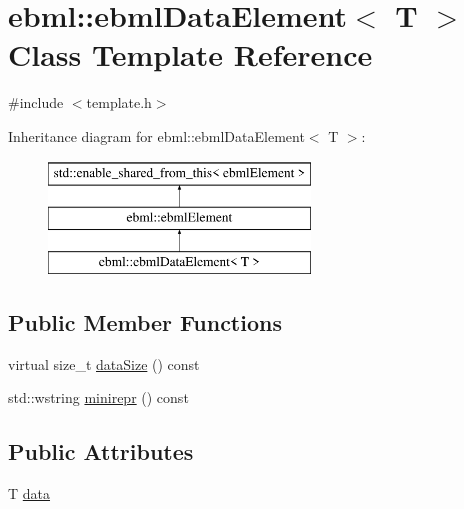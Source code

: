 \hypertarget{classebml_1_1ebmlDataElement}{}\section{ebml\+:\+:ebml\+Data\+Element$<$ T $>$ Class Template Reference}
\label{classebml_1_1ebmlDataElement}


{\ttfamily \#include $<$template.\+h$>$}

Inheritance diagram for ebml\+:\+:ebml\+Data\+Element$<$ T $>$\+:\begin{figure}[H]
\begin{center}
\leavevmode
\includegraphics[height=3.000000cm]{classebml_1_1ebmlDataElement}
\end{center}
\end{figure}
\subsection*{Public Member Functions}
\begin{DoxyCompactItemize}
\item 
virtual size\+\_\+t \mbox{\hyperlink{classebml_1_1ebmlDataElement_add3cc3627008b8139a054a3a0696bc2d}{data\+Size}} () const
\item 
std\+::wstring \mbox{\hyperlink{classebml_1_1ebmlDataElement_a721eb3bfcb545510f2cebad65776f1bd}{minirepr}} () const
\end{DoxyCompactItemize}
\subsection*{Public Attributes}
\begin{DoxyCompactItemize}
\item 
T \mbox{\hyperlink{classebml_1_1ebmlDataElement_aa0b68d39cf69e0a34ba7bb1d8368a386}{data}}
\end{DoxyCompactItemize}
